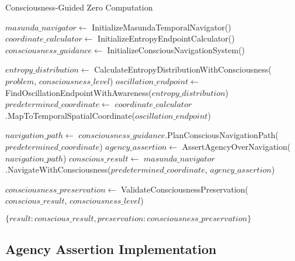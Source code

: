 \documentclass[12pt,a4paper]{article}
\begin{document}
\begin{algorithm}
\caption{Consciousness-Guided Zero Computation}
\begin{algorithmic}[1]
    \State $masunda\_navigator \gets$ InitializeMasundaTemporalNavigator()
    \State $coordinate\_calculator \gets$ InitializeEntropyEndpointCalculator()
    \State $consciousness\_guidance \gets$ InitializeConsciousNavigationSystem()
    
    \State $entropy\_distribution \gets$ CalculateEntropyDistributionWithConsciousness($problem$, $consciousness\_level$)
    \State $oscillation\_endpoint \gets$ FindOscillationEndpointWithAwareness($entropy\_distribution$)
    \State $predetermined\_coordinate \gets$ $coordinate\_calculator$.MapToTemporalSpatialCoordinate($oscillation\_endpoint$)
    
    \State $navigation\_path \gets$ $consciousness\_guidance$.PlanConsciousNavigationPath($predetermined\_coordinate$)
    \State $agency\_assertion \gets$ AssertAgencyOverNavigation($navigation\_path$)
    \State $conscious\_result \gets$ $masunda\_navigator$.NavigateWithConsciousness($predetermined\_coordinate$, $agency\_assertion$)
    
    \State $consciousness\_preservation \gets$ ValidateConsciousnessPreservation($conscious\_result$, $consciousness\_level$)
    
    \State \Return $\{result: conscious\_result, preservation: consciousness\_preservation\}$
\EndProcedure
\end{algorithmic}
\end{algorithm}

\subsection{Agency Assertion Implementation}
\end{document}
